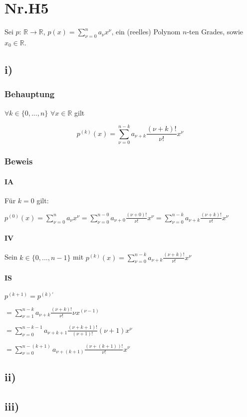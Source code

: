 \section*{Nr.H5}

Sei $p$: $\mathbb{R} \to \mathbb{R}$, $p(x)=\sum\limits^{n}_{\nu=0}a_{\nu}x^{\nu}$,
ein (reelles) Polynom $n$-ten Grades, sowie $x_{0} \in \mathbb{R}$.

\subsection*{i)}

\subsubsection*{Behauptung}

$\forall k \in \{0,...,n\}$ $\forall x \in \mathbb{R}$ gilt

\[
	p^{(k)}(x) = \sum\limits^{n-k}_{\nu=0}a_{\nu+k}\frac{(\nu+k)!}{\nu!}x^{\nu} 
\]

\subsubsection*{Beweis}

\paragraph*{IA}

Für $k = 0$ gilt:

$
 p^{(0)}(x)
 = \sum\limits^{n}_{\nu=0} a_{\nu} x^{\nu}
 = \sum\limits^{n-0}_{\nu=0} a_{\nu+0} \frac{(\nu+0)!}{\nu!} x^{\nu}
 = \sum\limits^{n-k}_{\nu=0} a_{\nu+k} \frac{(\nu+k)!}{\nu!} x^{\nu}
$  


\paragraph*{IV}

Sein $k \in \{0,...,n-1\}$ mit 
$p^{(k)}(x) = \sum\limits^{n-k}_{\nu=0}a_{\nu+k}\frac{(\nu+k)!}{\nu!}x^{\nu} $

\paragraph*{IS}

$ p^{(k+1)} = p^{(k)\prime}$

$ = \sum\limits^{n-k}_{\nu=1} a_{\nu+k} \frac{(\nu+k)!}{\nu!} \nu x^{(\nu-1)}$

$ = \sum\limits^{n-k-1}_{\nu=0} a_{\nu+k+1} \frac{(\nu+k+1)!}{(\nu+1)!} (\nu+1)x^{\nu}$

$ = \sum\limits^{n -(k+1)}_{\nu=0} a_{\nu+(k+1)} \frac{(\nu+(k+1))!}{\nu!} x^{\nu}$

\subsection*{ii)}

\subsection*{iii)}
